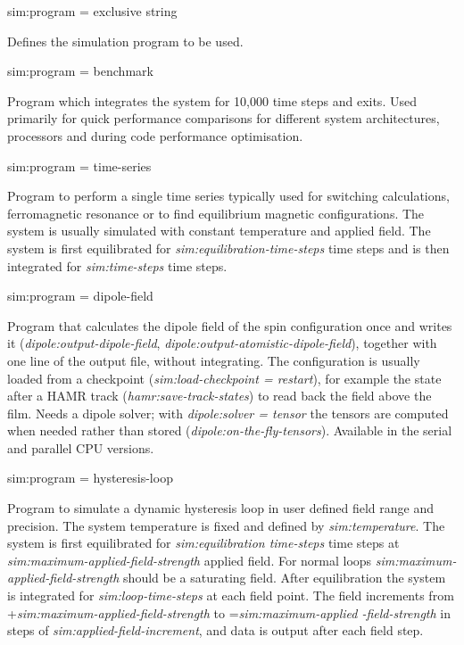 {\zicf sim:program = exclusive string} Defines the simulation program to be used.

{\zicf sim:program = benchmark} Program which integrates the system for 10,000 time steps and exits. Used primarily for quick performance comparisons for different system architectures, processors and during code performance optimisation.

{\zicf sim:program = time-series} Program to perform a single time series typically used for switching calculations, ferromagnetic resonance or to find equilibrium magnetic configurations. The system is usually simulated with constant temperature and applied field. The system is first equilibrated for \textit{sim:equilibration-time-steps} time steps and is then integrated for \textit{sim:time-steps} time steps.

{\zicf sim:program = dipole-field} Program that calculates the dipole field of the spin configuration once and writes it (\textit{dipole:output-dipole-field}, \textit{dipole:output-atomistic-dipole-field}), together with one line of the output file, without integrating. The configuration is usually loaded from a checkpoint (\textit{sim:load-checkpoint = restart}), for example the state after a HAMR track (\textit{hamr:save-track-states}) to read back the field above the film. Needs a dipole solver; with \textit{dipole:solver = tensor} the tensors are computed when needed rather than stored (\textit{dipole:on-the-fly-tensors}). Available in the serial and parallel CPU versions.

{\zicf sim:program = hysteresis-loop} Program to simulate a dynamic hysteresis loop in user defined field range and precision. The system temperature is fixed and defined by \textit{sim:temperature}. The system is first equilibrated for \textit{sim:equilibration time-steps} time steps at \textit{sim:maximum-applied-field-strength} applied field. For normal loops \textit{sim:maximum-applied-field-strength} should be a saturating field. After equilibration the system is integrated for \textit{sim:loop-time-steps} at each field point. The field increments from +\textit{sim:maximum-applied-field-strength} to =\textit{sim:maximum-applied -field-strength} in steps of \textit{sim:applied-field-increment}, and data is output after each field step.

